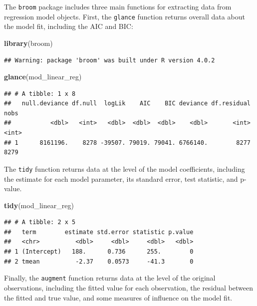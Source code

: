 \documentclass[
]{book}
\newenvironment{Shaded}{\begin{snugshade}}{\end{snugshade}}
\newcommand{\KeywordTok}[1]{\textcolor[rgb]{0.13,0.29,0.53}{\textbf{#1}}}
\newcommand{\NormalTok}[1]{#1}
\begin{document}
The \texttt{broom} package includes three main functions for extracting data from
regression model objects. First, the \texttt{glance} function returns overall data
about the model fit, including the AIC and BIC:

\begin{Shaded}
\begin{Highlighting}[]
\KeywordTok{library}\NormalTok{(broom)}
\end{Highlighting}
\end{Shaded}

\begin{verbatim}
## Warning: package 'broom' was built under R version 4.0.2
\end{verbatim}

\begin{Shaded}
\begin{Highlighting}[]
\KeywordTok{glance}\NormalTok{(mod_linear_reg)}
\end{Highlighting}
\end{Shaded}

\begin{verbatim}
## # A tibble: 1 x 8
##   null.deviance df.null  logLik    AIC    BIC deviance df.residual  nobs
##           <dbl>   <int>   <dbl>  <dbl>  <dbl>    <dbl>       <int> <int>
## 1      8161196.    8278 -39507. 79019. 79041. 6766140.        8277  8279
\end{verbatim}

The \texttt{tidy} function returns data at the level of the model coefficients,
including the estimate for each model parameter, its standard error, test
statistic, and p-value.

\begin{Shaded}
\begin{Highlighting}[]
\KeywordTok{tidy}\NormalTok{(mod_linear_reg)}
\end{Highlighting}
\end{Shaded}

\begin{verbatim}
## # A tibble: 2 x 5
##   term        estimate std.error statistic p.value
##   <chr>          <dbl>     <dbl>     <dbl>   <dbl>
## 1 (Intercept)   188.      0.736      255.        0
## 2 tmean          -2.37    0.0573     -41.3       0
\end{verbatim}

Finally, the \texttt{augment} function returns data at the level of the original
observations, including the fitted value for each observation, the residual
between the fitted and true value, and some measures of influence on the model
fit.
\end{document}
